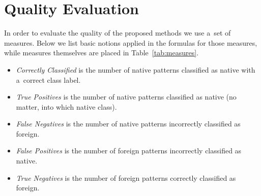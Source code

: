 \chapter{Quality Evaluation} \label{quality_measures}

In order to evaluate the quality of the proposed methods we use a~set of measures. Below we list basic notions applied in the formulas for those measures, while measures themselves are placed in Table~\ref{tab:measures}.
\begin{itemize}
	\item \emph{Correctly Classified} is the number of native patterns classified as native with a~correct class label.
	\item \emph{True Positives} is the number of native patterns classified as native (no matter, into which native class).
	\item \emph{False Negatives} is the number of native patterns incorrectly classified as foreign.
	\item \emph{False Positives} is the number of foreign patterns incorrectly classified as native.
	\item \emph{True Negatives} is the number of foreign patterns correctly classified as foreign.
\end{itemize}  


